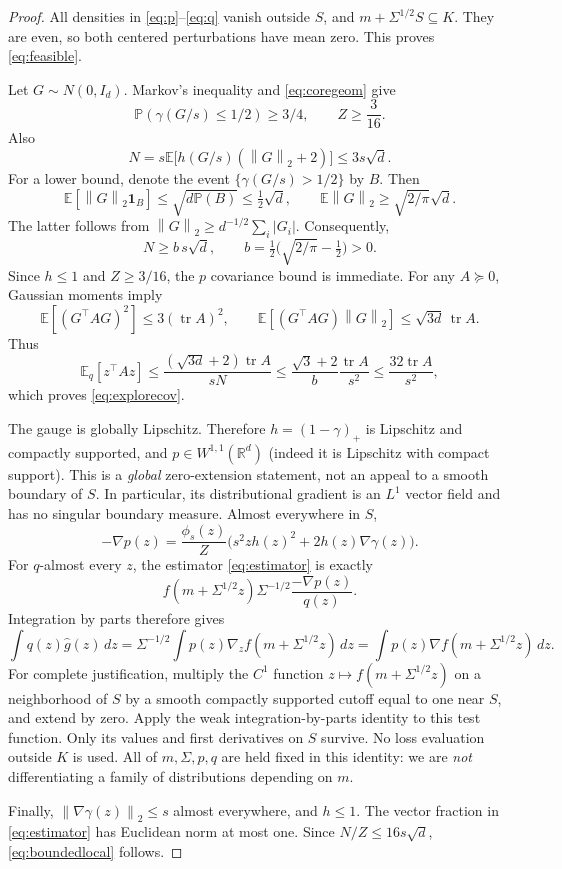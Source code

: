 \documentclass[11pt]{article}
\numberwithin{equation}{section}
\newcommand{\R}{\mathbb R}
\newcommand{\E}{\mathbb E}
\newcommand{\Pp}{\mathbb P}
\newcommand{\tr}{\operatorname{tr}}
\newcommand{\norm}[1]{\left\|#1\right\|}
\theoremstyle{definition}
\theoremstyle{remark}
\begin{document}
\begin{proof}
All densities in \eqref{eq:p}--\eqref{eq:q} vanish outside $S$, and
$m+\Sigma^{1/2}S\subseteq K$. They are even, so both centered perturbations
have mean zero. This proves \eqref{eq:feasible}.

Let $G\sim N(0,I_d)$. Markov's inequality and \eqref{eq:coregeom} give
\[
 \Pp(\gamma(G/s)\leq1/2)\geq3/4,
 \qquad Z\geq\frac{3}{16}.
\]
Also
\[
 N=s\E\bigl[h(G/s)(\norm G_2+2)\bigr]\leq3s\sqrt d.
\]
For a lower bound, denote the event $\{\gamma(G/s)>1/2\}$ by $B$. Then
\[
 \E[\norm G_2\mathbf1_B]\leq\sqrt{d\Pp(B)}\leq\tfrac12\sqrt d,
 \qquad \E\norm G_2\geq\sqrt{2/\pi}\sqrt d.
\]
The latter follows from $\norm G_2\geq d^{-1/2}\sum_i|G_i|$. Consequently,
\begin{equation}\label{eq:Nlower}
 N\geq b\,s\sqrt d,
 \qquad b=\tfrac12\bigl(\sqrt{2/\pi}-\tfrac12\bigr)>0.
\end{equation}
Since $h\leq1$ and $Z\geq3/16$, the $p$ covariance bound is immediate.
For any $A\succeq0$, Gaussian moments imply
\[
 \E[(G^\top A G)^2]\leq3(\tr A)^2,
 \qquad \E[(G^\top A G)\norm G_2]\leq\sqrt{3d}\,\tr A.
\]
Thus
\[
 \E_q[z^\top A z]
 \leq\frac{(\sqrt{3d}+2)\tr A}{sN}
 \leq\frac{\sqrt3+2}{b}\frac{\tr A}{s^2}
 \leq\frac{32\tr A}{s^2},
\]
which proves \eqref{eq:explorecov}.

The gauge is globally Lipschitz. Therefore $h=(1-\gamma)_+$ is
Lipschitz and compactly supported, and $p\in W^{1,1}(\R^d)$ (indeed it is
Lipschitz with compact support). This is a \emph{global} zero-extension statement,
not an appeal to a smooth boundary of $S$. In particular, its distributional
gradient is an $L^1$ vector field and has no singular boundary measure.
Almost everywhere in $S$,
\begin{equation}\label{eq:scoreidentity}
 -\nabla p(z)=\frac{\phi_s(z)}{Z}
       \bigl(s^2z h(z)^2+2h(z)\nabla\gamma(z)\bigr).
\end{equation}
For $q$-almost every $z$, the estimator \eqref{eq:estimator} is exactly
\[
 f(m+\Sigma^{1/2}z)\Sigma^{-1/2}\frac{-\nabla p(z)}{q(z)}.
\]
Integration by parts therefore gives
\[
 \int q(z)\widehat g(z)\,dz
 =\Sigma^{-1/2}\int p(z)\nabla_z f(m+\Sigma^{1/2}z)\,dz
 =\int p(z)\nabla f(m+\Sigma^{1/2}z)\,dz.
\]
For complete justification, multiply the $C^1$ function
$z\mapsto f(m+\Sigma^{1/2}z)$ on a neighborhood of $S$ by a smooth compactly
supported cutoff equal to one near $S$, and extend by zero. Apply the weak
integration-by-parts identity to this test function. Only its values and
first derivatives on $S$ survive. No loss evaluation outside $K$ is used.
All of $m,\Sigma,p,q$ are held fixed in this identity: we are \emph{not}
differentiating a family of distributions depending on $m$.

Finally, $\norm{\nabla\gamma(z)}_2\leq s$ almost everywhere, and $h\leq1$.
The vector fraction in \eqref{eq:estimator} has Euclidean norm at most one.
Since $N/Z\leq16s\sqrt d$, \eqref{eq:boundedlocal} follows.
\end{proof}
\end{document}
